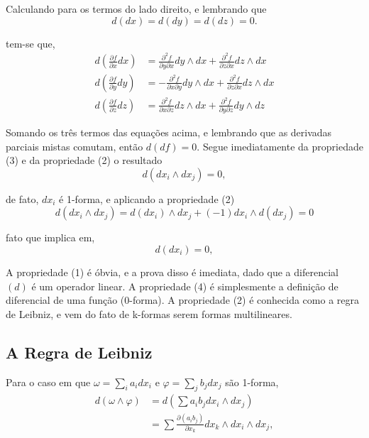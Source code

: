 Calculando para os termos do lado direito, e lembrando que 
%
\begin{equation}
d(dx) = d(dy) = d(dz) = 0.    
\end{equation}

tem-se que,
%
\begin{align}
d\left(\frac{\partial f}{\partial x}dx\right) &= 
\frac{\partial^2f}{\partial y \partial x} dy \wedge dx 
+ \frac{\partial^2f}{\partial z \partial x} dz \wedge dx   
\\
d\left(\frac{\partial f}{\partial y}dy\right) &= 
- \frac{\partial^2f}{\partial x \partial y} dy \wedge dx 
+ \frac{\partial^2f}{\partial z \partial x} dz \wedge dx  
\\
d\left(\frac{\partial f}{\partial z}dz\right) &= 
\frac{\partial^2f}{\partial x \partial z} dz \wedge dx 
+ \frac{\partial^2f}{\partial y \partial z} dy \wedge dz
\end{align}

Somando os três termos das equações acima, e lembrando que as derivadas parciais mistas comutam, então $d(df) = 0$. Segue imediatamente da propriedade (3) e da propriedade (2) o resultado 
%
\begin{equation}
d(dx_i \wedge dx_j) = 0,    
\end{equation}

de fato, $dx_i$ é 1-forma, e aplicando a propriedade (2)
%
\begin{equation}
d(dx_i \wedge dx_j) = d(dx_i) \wedge dx_j 
+ (-1)dx_i \wedge d(dx_j) = 0   
\end{equation}

fato que implica em,
%
\begin{equation}
d(dx_i) = 0,
\end{equation}

A propriedade (1) é óbvia, e a prova disso é imediata, dado que a diferencial $(d)$ é um operador linear. A propriedade (4) é simplesmente a definição de diferencial de uma função (0-forma). A propriedade (2) é conhecida como a regra de Leibniz, e vem do fato de k-formas serem formas multilineares.


\subsection{A Regra de Leibniz}

\hspace{0.5cm}
Para o caso em que $\omega = \sum_{i}a_i dx_i$ e $\varphi 
= \sum_{j}b_j dx_j$ são 1-forma,
%
\begin{align}
\nonumber d(\omega \wedge \varphi) &= d\left(\sum a_{i} b_{j} dx_{i} 
\wedge dx_{j} \right) 
\\ 
&= \sum \frac{\partial (a_i b_j)}{\partial x_k} dx_k \wedge dx_i \wedge dx_j,
\end{align}


